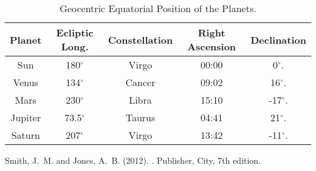 \documentclass{article}
\begin{document}
\begin{table}[h!]
\begin{center}
\begin{tabular}{| c | c | c | c | c | }
\hline
Planet & Ecliptic Long. & Constellation & Right Ascension & Declination\\
\hline
\hline
Sun & 180$^\circ$ & Virgo & 00:00 & 0$^\circ$. \\
Venus & 134$^\circ$ & Cancer & 09:02 & 16$^\circ$. \\
Mars & 230$^\circ$ & Libra & 15:10 & -17$^\circ$. \\
Jupiter & 73.5$^\circ$ & Taurus & 04:41 & 21$^\circ$. \\
Saturn & 207$^\circ$ & Virgo & 13:42 & -11$^\circ$. \\
\hline
\end{tabular}
\end{center}
\caption{Geocentric Equatorial Position of the Planets.\label{tab:pos}}
\end{table}


\begin{thebibliography}{9}

Smith, J.~M. and Jones, A.~B. (2012).
.
\newblock Publisher, City, 7th edition.

\end{thebibliography}
\end{document}
